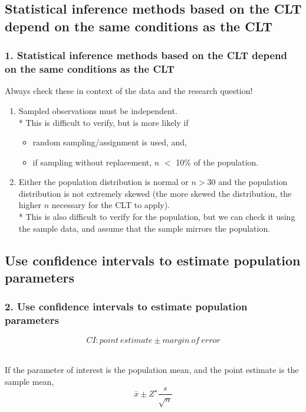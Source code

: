 \documentclass[slidestop,compress,mathserif,12pt,t,professionalfonts,xcolor=table]{beamer}
\begin{document}
\subsection{Statistical inference methods based on the CLT depend on the same conditions as the CLT}
\label{mi1}


\begin{frame}
\frametitle{1. Statistical inference methods based on the CLT depend on the same conditions as the CLT}

Always check these in context of the data and the research question!

\begin{enumerate}

\item {} Sampled observations must be independent. \\
* This is difficult to verify, but is more likely if
\begin{itemize}
\item random sampling/assignment is used, and,
\item if sampling without replacement, $n$ $<$ 10\% of the population.
\end{itemize}

\item {} Either the population distribution is normal or $n > 30$ and the population distribution is not extremely skewed (the more skewed the distribution, the higher $n$ necessary for the CLT to apply).\\
* This is also difficult to verify for the population, but we can check it using the sample data, and assume that the sample mirrors the population.

\end{enumerate}

\end{frame}


\subsection{Use confidence intervals to estimate population parameters}
\label{mi2}


\begin{frame}
\frametitle{2. Use confidence intervals to estimate population parameters}

\vfill

\[ CI: point~estimate \pm margin~of~error \]
$\:$ \\

\pause

If the parameter of interest is the population mean, and the point estimate is the sample mean,
\[ \bar{x} \pm Z^\star \frac{s}{\sqrt{n}} \]

\vfill

\end{frame}
\end{document}
